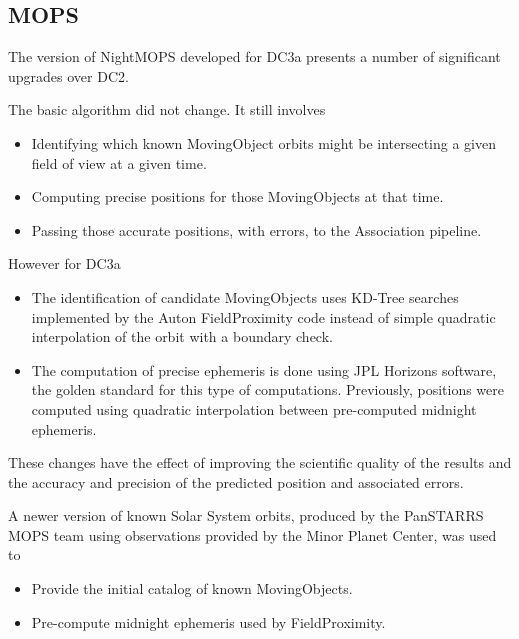 
\subsection{MOPS}

The version of NightMOPS developed for DC3a presents a number of significant 
upgrades over DC2.

The basic algorithm did not change. It still involves
\begin{itemize}
    \item Identifying which known MovingObject orbits might be intersecting a 
          given field of view at a given time.
    \item Computing precise positions for those MovingObjects at that time.
    \item Passing those accurate positions, with errors, to the Association 
          pipeline.
\end{itemize}

However for DC3a
\begin{itemize}
    \item The identification of candidate MovingObjects uses KD-Tree searches 
          implemented by the Auton FieldProximity code instead of simple 
          quadratic interpolation of the orbit with a boundary check.
    \item The computation of precise ephemeris is done using JPL Horizons 
          software, the golden standard for this type of computations. 
          Previously, positions were computed using quadratic interpolation 
          between pre-computed midnight ephemeris.
\end{itemize}
These changes have the effect of improving the scientific quality of the results
and the accuracy and precision of the predicted position and associated errors.

A newer version of known Solar System orbits, produced by the PanSTARRS MOPS 
team using observations provided by the Minor Planet Center, was used to
\begin{itemize}
    \item Provide the initial catalog of known MovingObjects.
    \item Pre-compute midnight ephemeris used by FieldProximity.
\end{itemize}









